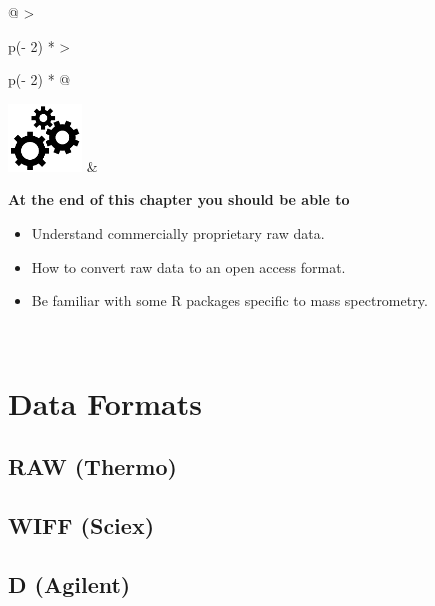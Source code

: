 \documentclass[
]{book}
\begin{document}
\begin{longtable}[]{@{}
  >{\raggedright\arraybackslash}p{(\columnwidth - 2\tabcolsep) * }
  >{\raggedright\arraybackslash}p{(\columnwidth - 2\tabcolsep) * }@{}}
\toprule\noalign{}
\endhead
\bottomrule\noalign{}
\endlastfoot
\includegraphics[width=\textwidth,height=0.70833in]{images/03.png} & \begin{minipage}[t]{\linewidth}\raggedright
\textbf{At the end of this chapter you should be able to}

\begin{itemize}
\item
  Understand commercially proprietary raw data.
\item
  How to convert raw data to an open access format.
\item
  Be familiar with some R packages specific to mass spectrometry.
\end{itemize}
\end{minipage} \\
\end{longtable}

\hfill\break

\hypertarget{data-formats}{%
\section{Data Formats}\label{data-formats}}

\hypertarget{raw-thermo}{%
\subsection*{RAW (Thermo)}\label{raw-thermo}}

\hypertarget{wiff-sciex}{%
\subsection*{WIFF (Sciex)}\label{wiff-sciex}}

\hypertarget{d-agilent}{%
\subsection*{D (Agilent)}\label{d-agilent}}
\end{document}
